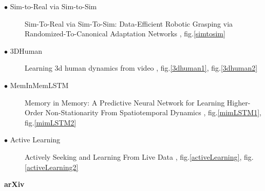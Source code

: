 \documentclass[12pt]{article}
\begin{document}
\begin{description}
  \item[$\bullet$ Sim-to-Real via Sim-to-Sim] Sim-To-Real via Sim-To-Sim: Data-Efficient Robotic Grasping via
Randomized-To-Canonical Adaptation Networks \cite{James_2019_CVPR},
fig.\ref{simtosim}
\item[$\bullet$ 3DHuman] Learning 3d human dynamics from video
  \cite{kanazawa_2019_cvpr}, fig.\ref{3dhuman1}, fig.\ref{3dhuman2}
\item[$\bullet$ MemInMemLSTM] Memory in Memory: A Predictive Neural Network for
  Learning Higher-Order Non-Stationarity From Spatiotemporal Dynamics \cite{Wang_2019_CVPR}, fig.\ref{mimLSTM1}, fig.\ref{mimLSTM2}

\item[$\bullet$ Active Learning] Actively Seeking and Learning From Live Data
  \cite{Teney_2019_CVPR}, fig.\ref{activeLearning}, fig.\ref{activeLearning2}


\end{description}


{\LARGE\noindent\textbf{arXiv}}
\end{document}
